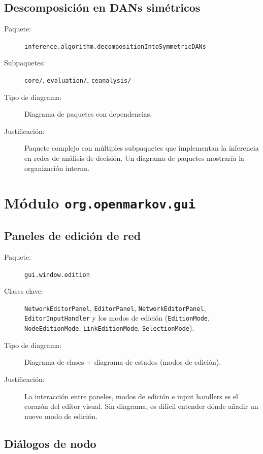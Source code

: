\documentclass[11pt,a4paper]{article}
\newcommand{\code}[1]{\texttt{#1}}
\newcommand{\pkg}[1]{\texttt{\small #1}}
\begin{document}
\subsection{Descomposici\'on en DANs sim\'etricos}

\begin{description}
  \item[Paquete:] \pkg{inference.algorithm.decompositionIntoSymmetricDANs}
  \item[Subpaquetes:] \code{core/}, \code{evaluation/},
        \code{ceanalysis/}
  \item[Tipo de diagrama:] Diagrama de paquetes con dependencias.
  \item[Justificaci\'on:] Paquete complejo con m\'ultiples subpaquetes
        que implementan la inferencia en redes de an\'alisis de
        decisi\'on.  Un diagrama de paquetes mostrar\'ia la
        organizaci\'on interna.
\end{description}

\section{M\'odulo \code{org.openmarkov.gui}}

\subsection{Paneles de edici\'on de red}

\begin{description}
  \item[Paquete:] \pkg{gui.window.edition}
  \item[Clases clave:] \code{NetworkEditorPanel},
        \code{EditorPanel}, \code{NetworkEditorPanel},
        \code{EditorInputHandler} y los modos de edici\'on
        (\code{EditionMode}, \code{NodeEditionMode},
        \code{LinkEditionMode}, \code{SelectionMode}).
  \item[Tipo de diagrama:] Diagrama de clases + diagrama de estados
        (modos de edici\'on).
  \item[Justificaci\'on:] La interacci\'on entre paneles, modos de
        edici\'on e input handlers es el coraz\'on del editor visual.
        Sin diagrama, es dif\'icil entender d\'onde a\~nadir un nuevo
        modo de edici\'on.
\end{description}

\subsection{Di\'alogos de nodo}
\end{document}
